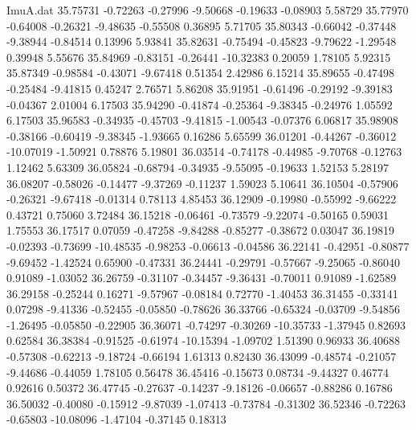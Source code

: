 \begin{filecontents}{ImuA.dat}
  35.75731   -0.72263   -0.27996   -9.50668   -0.19633   -0.08903    5.58729
  35.77970   -0.64008   -0.26321   -9.48635   -0.55508    0.36895    5.71705
  35.80343   -0.66042   -0.37448   -9.38944   -0.84514    0.13996    5.93841
  35.82631   -0.75494   -0.45823   -9.79622   -1.29548    0.39948    5.55676
  35.84969   -0.83151   -0.26441  -10.32383    0.20059    1.78105    5.92315
  35.87349   -0.98584   -0.43071   -9.67418    0.51354    2.42986    6.15214
  35.89655   -0.47498   -0.25484   -9.41815    0.45247    2.76571    5.86208
  35.91951   -0.61496   -0.29192   -9.39183   -0.04367    2.01004    6.17503
  35.94290   -0.41874   -0.25364   -9.38345   -0.24976    1.05592    6.17503
  35.96583   -0.34935   -0.45703   -9.41815   -1.00543   -0.07376    6.06817
  35.98908   -0.38166   -0.60419   -9.38345   -1.93665    0.16286    5.65599
  36.01201   -0.44267   -0.36012  -10.07019   -1.50921    0.78876    5.19801
  36.03514   -0.74178   -0.44985   -9.70768   -0.12763    1.12462    5.63309
  36.05824   -0.68794   -0.34935   -9.55095   -0.19633    1.52153    5.28197
  36.08207   -0.58026   -0.14477   -9.37269   -0.11237    1.59023    5.10641
  36.10504   -0.57906   -0.26321   -9.67418   -0.01314    0.78113    4.85453
  36.12909   -0.19980   -0.55992   -9.66222    0.43721    0.75060    3.72484
  36.15218   -0.06461   -0.73579   -9.22074   -0.50165    0.59031    1.75553
  36.17517    0.07059   -0.47258   -9.84288   -0.85277   -0.38672    0.03047
  36.19819   -0.02393   -0.73699  -10.48535   -0.98253   -0.06613   -0.04586
  36.22141   -0.42951   -0.80877   -9.69452   -1.42524    0.65900   -0.47331
  36.24441   -0.29791   -0.57667   -9.25065   -0.86040    0.91089   -1.03052
  36.26759   -0.31107   -0.34457   -9.36431   -0.70011    0.91089   -1.62589
  36.29158   -0.25244    0.16271   -9.57967   -0.08184    0.72770   -1.40453
  36.31455   -0.33141    0.07298   -9.41336   -0.52455   -0.05850   -0.78626
  36.33766   -0.65324   -0.03709   -9.54856   -1.26495   -0.05850   -0.22905
  36.36071   -0.74297   -0.30269  -10.35733   -1.37945    0.82693    0.62584
  36.38384   -0.91525   -0.61974  -10.15394   -1.09702    1.51390    0.96933
  36.40688   -0.57308   -0.62213   -9.18724   -0.66194    1.61313    0.82430
  36.43099   -0.48574   -0.21057   -9.44686   -0.44059    1.78105    0.56478
  36.45416   -0.15673    0.08734   -9.44327    0.46774    0.92616    0.50372
  36.47745   -0.27637   -0.14237   -9.18126   -0.06657   -0.88286    0.16786
  36.50032   -0.40080   -0.15912   -9.87039   -1.07413   -0.73784   -0.31302
  36.52346   -0.72263   -0.65803  -10.08096   -1.47104   -0.37145    0.18313

\end{filecontents}
